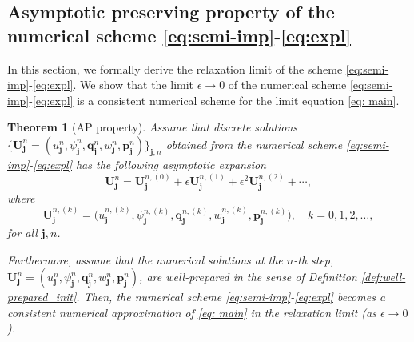 \documentclass[11pt]{article}
\numberwithin{equation}{section}
\newtheorem{theorem} {Theorem}[section]
\newtheorem{counter example}[theorem]{Counter Example}
\numberwithin{equation}{section}
\numberwithin{equation}{section}
\begin{document}
\subsection{Asymptotic preserving property of the numerical scheme \eqref{eq:semi-imp}-\eqref{eq:expl}}
\label{sec:AP}

In this section, we formally derive the relaxation limit of the scheme \eqref{eq:semi-imp}-\eqref{eq:expl}. We show that the limit $\epsilon\to 0$ of the numerical scheme \eqref{eq:semi-imp}-\eqref{eq:expl} is a consistent numerical scheme for the limit equation \eqref{eq: main}.

\begin{theorem}[AP property]
Assume that discrete solutions $\{\mathbf{U}_{\mathbf{j}}^n = (u_{\mathbf{j}}^n, \psi_{\mathbf{j}}^n, \mathbf{q}_{\mathbf{j}}^n, w_{\mathbf{j}}^n, \mathbf{p}_{\mathbf{j}}^n)\}_{\mathbf{j},n}$ obtained from the numerical scheme \eqref{eq:semi-imp}-\eqref{eq:expl} has the following asymptotic expansion
\begin{equation}
\label{eq:asymp-exp}
\mathbf{U}_{\mathbf{j}}^n = \mathbf{U}_{\mathbf{j}}^{n,(0)} + \epsilon \mathbf{U}_{\mathbf{j}}^{n,(1)} + \epsilon^2 \mathbf{U}_{\mathbf{j}}^{n,(2)} + \cdots,
\end{equation}
where
\begin{equation}
    \mathbf{U}_{\mathbf{j}}^{n,(k)} = \big(u_{\mathbf{j}}^{n,(k)}, \psi_{\mathbf{j}}^{n,(k)}, \mathbf{q}_{\mathbf{j}}^{n,(k)}, w_{\mathbf{j}}^{n,(k)}, \mathbf{p}_{\mathbf{j}}^{n,(k)}\big),
\quad k=0,1,2,\dots,
\end{equation}
for all $\mathbf{j}, n$.

Furthermore, assume that the numerical solutions at the $n$-th step, $\mathbf{U}_{\mathbf{j}}^n = (u_{\mathbf{j}}^n, \psi_{\mathbf{j}}^n, \mathbf{q}_{\mathbf{j}}^n, w_{\mathbf{j}}^n, \mathbf{p}_{\mathbf{j}}^n)$, are well-prepared in the sense of Definition \eqref{def:well-prepared_init}. Then, the numerical scheme \eqref{eq:semi-imp}-\eqref{eq:expl} becomes a consistent numerical approximation of \eqref{eq: main} in the relaxation limit (as $\epsilon\to 0$).
\end{theorem}
\end{document}
